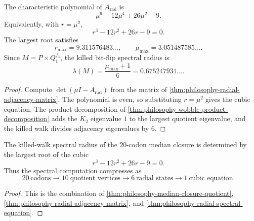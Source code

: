 \begin{theorem}
\label{thm:philosophy-radial-spectral-equation}
The characteristic polynomial of $A_{\mathrm{rad}}$ is
$$
  \mu^{6}-12\mu^{4}+26\mu^{2}-9.
$$
Equivalently, with $r=\mu^{2}$,
$$
  r^{3}-12r^{2}+26r-9=0.
$$
The largest root satisfies
$$
  r_{\max}=9.311576483\ldots,
  \qquad
  \mu_{\max}=3.051487585\ldots.
$$
Since $M=P\times Q_{1}^{f_{3}}$, the killed bit-flip spectral radius is
$$
  \lambda(M)
  =
  \frac{\mu_{\max}+1}{6}
  =
  0.675247931\ldots.
$$
\end{theorem}
\begin{proof}
Compute $\det(\mu I-A_{\mathrm{rad}})$ from the matrix of
\autoref{thm:philosophy-radial-adjacency-matrix}. The polynomial is even,
so substituting $r=\mu^{2}$ gives the cubic equation. The product
decomposition of \autoref{thm:philosophy-wobble-product-decomposition}
adds the $K_{2}$ eigenvalue $1$ to the largest quotient eigenvalue, and
the killed walk divides adjacency eigenvalues by $6$.
\end{proof}

\begin{corollary}
\label{cor:philosophy-analytic-compression-killed-walk-spectrum}
The killed-walk spectral radius of the $20$-codon median closure is
determined by the largest root of the cubic
$$
  r^{3}-12r^{2}+26r-9=0.
$$
Thus the spectral computation compresses as
$$
  20\ \text{codons}
  \longrightarrow
  10\ \text{quotient vertices}
  \longrightarrow
  6\ \text{radial states}
  \longrightarrow
  1\ \text{cubic equation}.
$$
\end{corollary}
\begin{proof}
This is the combination of
\autoref{thm:philosophy-median-closure-quotient},
\autoref{thm:philosophy-radial-adjacency-matrix}, and
\autoref{thm:philosophy-radial-spectral-equation}.
\end{proof}

